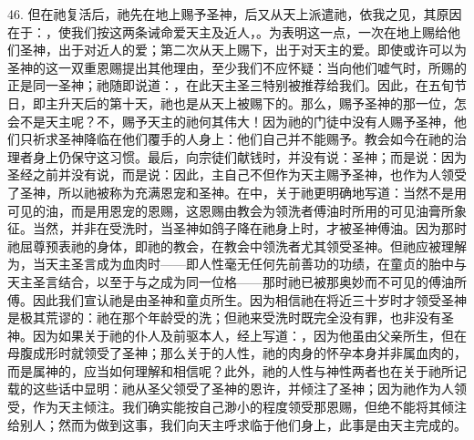 46. 但在祂复活后，祂先在地上赐予圣神，后又从天上派遣祂，依我之见，其原因在于：，使我们按这两条诫命爱天主及近人，。为表明这一点，一次在地上赐给他们圣神，出于对近人的爱；第二次从天上赐下，出于对天主的爱。即使或许可以为圣神的这一双重恩赐提出其他理由，至少我们不应怀疑：当向他们嘘气时，所赐的正是同一圣神；祂随即说道：，在此天主圣三特别被推荐给我们。因此，在五旬节日，即主升天后的第十天，祂也是从天上被赐下的。那么，赐予圣神的那一位，怎会不是天主呢？不，赐予天主的祂何其伟大！因为祂的门徒中没有人赐予圣神，他们只祈求圣神降临在他们覆手的人身上：他们自己并不能赐予。教会如今在祂的治理者身上仍保守这习惯。最后，向宗徒们献钱时，并没有说：圣神；而是说：因为圣经之前并没有说，而是说：因此，主自己不但作为天主赐予圣神，也作为人领受了圣神，所以祂被称为充满恩宠和圣神。在中，关于祂更明确地写道：当然不是用可见的油，而是用恩宠的恩赐，这恩赐由教会为领洗者傅油时所用的可见油膏所象征。当然，并非在受洗时，当圣神如鸽子降在祂身上时，才被圣神傅油。因为那时祂屈尊预表祂的身体，即祂的教会，在教会中领洗者尤其领受圣神。但祂应被理解为，当天主圣言成为血肉时——即人性毫无任何先前善功的功绩，在童贞的胎中与天主圣言结合，以至于与之成为同一位格——那时祂已被那奥妙而不可见的傅油所傅。因此我们宣认祂是由圣神和童贞所生。因为相信祂在将近三十岁时才领受圣神是极其荒谬的：祂在那个年龄受的洗；但祂来受洗时既完全没有罪，也非没有圣神。因为如果关于祂的仆人及前驱本人，经上写道：，因为他虽由父亲所生，但在母腹成形时就领受了圣神；那么关于的人性，祂的肉身的怀孕本身并非属血肉的，而是属神的，应当如何理解和相信呢？此外，祂的人性与神性两者也在关于祂所记载的这些话中显明：祂从圣父领受了圣神的恩许，并倾注了圣神；因为祂作为人领受，作为天主倾注。我们确实能按自己渺小的程度领受那恩赐，但绝不能将其倾注给别人；然而为做到这事，我们向天主呼求临于他们身上，此事是由天主完成的。\par

